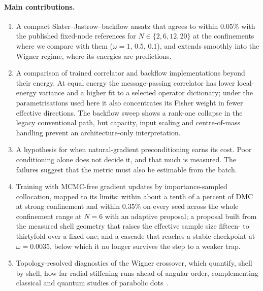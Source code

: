 \paragraph{Main contributions.}
\begin{enumerate}
  \item A compact Slater--Jastrow--backflow ansatz that agrees to within $0.05\%$ with the
        published fixed-node references for $N\in\{2,6,12,20\}$ at the confinements where we
        compare with them ($\omega=1$, $0.5$, $0.1$), and extends smoothly into the Wigner
        regime, where its energies are predictions.
  \item A comparison of trained correlator and backflow implementations beyond their energy.
        At equal energy the message-passing correlator has lower local-energy variance and a
        higher fit to a selected operator dictionary; under the parametrisations used here it
        also concentrates its Fisher weight in fewer effective directions. The backflow sweep
        shows a rank-one collapse in the legacy conventional path, but capacity, input scaling
        and centre-of-mass handling prevent an architecture-only interpretation.
  \item A hypothesis for when natural-gradient preconditioning earns its cost. Poor
        conditioning alone does not decide it, and that much is measured. The failures
        suggest that the metric must also be estimable from the batch.
  \item Training with MCMC-free gradient updates by importance-sampled collocation, mapped to its limits:
        within about a tenth of a percent of DMC at strong confinement and within $0.35\%$ on
        every seed across the whole confinement range at $N{=}6$ with an adaptive proposal; a proposal
        built from the measured shell geometry that raises the effective sample size
        fifteen- to thirtyfold over a fixed one; and a cascade that reaches a stable checkpoint
        at $\omega=0.0035$, below which it no longer survives the step to a weaker trap.
  \item Topology-resolved diagnostics of the Wigner crossover, which quantify, shell by
        shell, how far radial stiffening runs ahead of angular order, complementing classical and quantum
        studies of parabolic
        dots~\cite{Egger_1999,Kong_2002,schweigert1994spectralpropertieschargedparticles,Filinov_2001,Cavaliere2009-WignerTransport,Ghosal2007-WignerMolecules}.
\end{enumerate}

